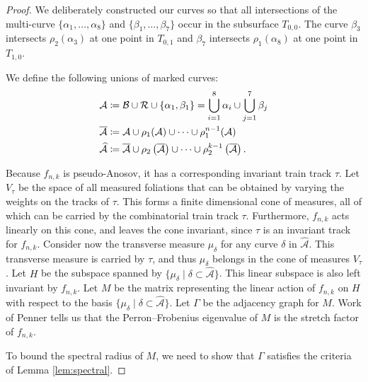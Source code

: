 \begin{proof}
 We deliberately constructed our curves so that all intersections of the multi-curve $\{\alpha_1,\dots,\alpha_8\}$ and $\{\beta_1,\dots,\beta_7\}$ occur in the subsurface $T_{0,0}$. The curve $\beta_3$ intersects $\rho_2(\alpha_3)$ at one point in $T_{0,1}$ and $\beta_7$ intersects $\rho_1(\alpha_8)$ at one point in $T_{1,0}$.

  We define the following unions of marked curves:
\begin{align*}
  \mathcal{A} &\coloneqq \mathcal{B} \cup \mathcal{R} \cup \{\alpha_1,\beta_1\} =\bigcup_{i=1}^8\alpha_i\cup\bigcup_{j=1}^7\beta_j\\
  \smallskip
  \overline{\mathcal{A}} &\coloneqq \mathcal{A} \cup \rho_1(\mathcal{A}) \cup \dots \cup \rho_1^{n-1}(\mathcal{A}) \\
  \widehat{\mathcal{A}} &\coloneqq \overline{\mathcal{A}} \cup \rho_2\left(\overline{\mathcal{A}}\right) \cup \dots \cup \rho_2^{k-1}\left(\overline{\mathcal{A}}\right).
\end{align*}

Because $f_{n,k}$ is pseudo-Anosov, it has a corresponding invariant train track $\tau$.
Let $V_{\tau}$ be the space of all measured foliations that can be obtained by varying the weights on the tracks of $\tau$.
This forms a finite dimensional cone of measures, all of which can be carried by the combinatorial train track $\tau$.
Furthermore, $f_{n,k}$ acts linearly on this cone, and leaves the cone invariant, since $\tau$ is an invariant track for $f_{n,k}$.
Consider now the transverse measure $\mu_{\delta}$ for any curve $\delta$ in $\widehat{\mathcal{A}}$.
This transverse measure is carried by $\tau$, and thus $\mu_{\delta}$ belongs in the cone of measures $V_{\tau}$.
Let $H$ be the subspace spanned by $\{\mu_\delta \mid \delta\subset\widehat{\mathcal{A}}\}$.
This linear subspace is also left invariant by $f_{n,k}$.  Let $M$
be the matrix representing the linear action of $f_{n,k}$ on $H$ with respect to the basis $\{\mu_\delta \mid \delta\subset\widehat{\mathcal{A}}\}$.  Let $\Gamma$ be the adjacency graph for $M$. Work of Penner \cite{penner1988construction} tells us that the Perron--Frobenius eigenvalue of $M$ is the stretch factor of $f_{n,k}$.


To bound the spectral radius of $M$, we need to show that $\Gamma$ satisfies
the criteria of Lemma \ref{lem:spectral}.




\end{proof}

